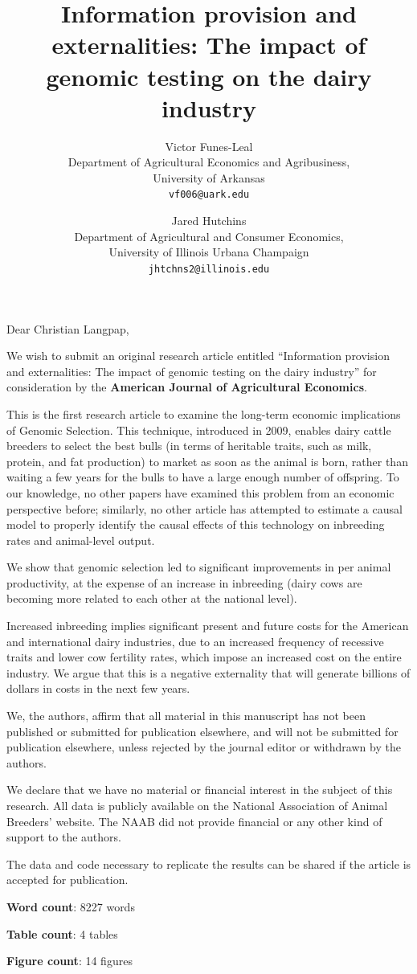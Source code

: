 \documentclass[12pt]{article}
\date{} %
\title{Information provision and externalities: The impact of genomic testing on the dairy industry}
\author{
    Victor Funes-Leal \\ %
    Department of Agricultural Economics and Agribusiness,\\
    University of Arkansas \\
    \texttt{vf006@uark.edu}
    \and %
    Jared Hutchins\\ %
    Department of Agricultural and Consumer Economics,\\
    University of Illinois Urbana Champaign \\
    \texttt{jhtchns2@illinois.edu}
}
\begin{document}
\maketitle

Dear Christian Langpap, 

We wish to submit an original research article entitled ``Information provision and externalities: The impact of genomic testing on the dairy industry'' for consideration by the \textbf{American Journal of Agricultural Economics}. 

This is the first research article to examine the long-term economic implications of Genomic Selection. This technique, introduced in 2009, enables dairy cattle breeders to select the best bulls (in terms of heritable traits, such as milk, protein, and fat production) to market as soon as the animal is born, rather than waiting a few years for the bulls to have a large enough number of offspring. To our knowledge, no other papers have examined this problem from an economic perspective before; similarly, no other article has attempted to estimate a causal model to properly identify the causal effects of this technology on inbreeding rates and animal-level output.

We show that genomic selection led to significant improvements in per animal productivity, at the expense of an increase in inbreeding (dairy cows are becoming more related to each other at the national level). 

Increased inbreeding implies significant present and future costs for the American and international dairy industries, due to an increased frequency of recessive traits and lower cow fertility rates, which impose an increased cost on the entire industry. We argue that this is a negative externality that will generate billions of dollars in costs in the next few years.

We, the authors, affirm that all material in this manuscript has not been published or submitted for publication elsewhere, and will not be submitted for publication elsewhere, unless rejected by the journal editor or withdrawn by the authors.

We declare that we have no material or financial interest in the subject of this research. All data is publicly available on the National Association of Animal Breeders' website. The NAAB did not provide financial or any other kind of support to the authors.

The data and code necessary to replicate the results can be shared if the article is accepted for publication.

\textbf{Word count}: 8227 words

\textbf{Table count}: 4 tables

\textbf{Figure count}: 14 figures
\end{document}
